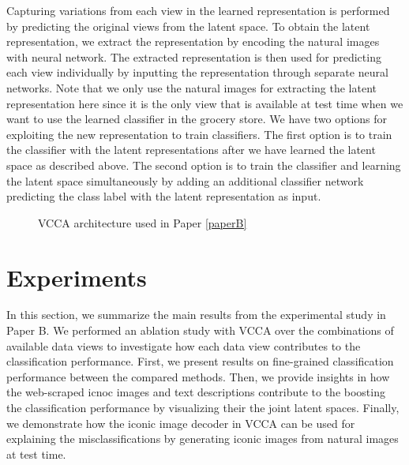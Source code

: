 Capturing variations from each view in the learned representation is performed by predicting the original views from the latent space. To obtain the latent representation, we extract the representation by encoding the natural images with neural network. The extracted representation is then used for predicting each view individually by inputting the representation through separate neural networks. Note that we only use the natural images for extracting the latent representation here since it is the only view that is available at test time when we want to use the learned classifier in the grocery store. We have two options for exploiting the new representation to train classifiers. The first option is to train the classifier with the latent representations after we have learned the latent space as described above. The second option is to train the classifier and learning the latent space simultaneously by adding an additional classifier network predicting the class label with the latent representation as input. 

\begin{figure}[t]
	\centering
	\resizebox{0.95\textwidth}{!}{
		
	}
	\caption{VCCA architecture used in Paper \ref{paperB}}
	\label{fig:vcca_architecture}
\end{figure}






\section{Experiments}\label{chap3:sec:experiments}

In this section, we summarize the main results from the experimental study in Paper B. We performed an ablation study with VCCA over the combinations of available data views to investigate how each data view contributes to the classification performance. First, we present results on fine-grained classification performance between the compared methods. Then, we provide insights in how the web-scraped icnoc images and text descriptions contribute to the boosting the classification performance by visualizing their the joint latent spaces. Finally, we demonstrate how the iconic image decoder in VCCA can be used for explaining the misclassifications by generating iconic images from natural images at test time. 

